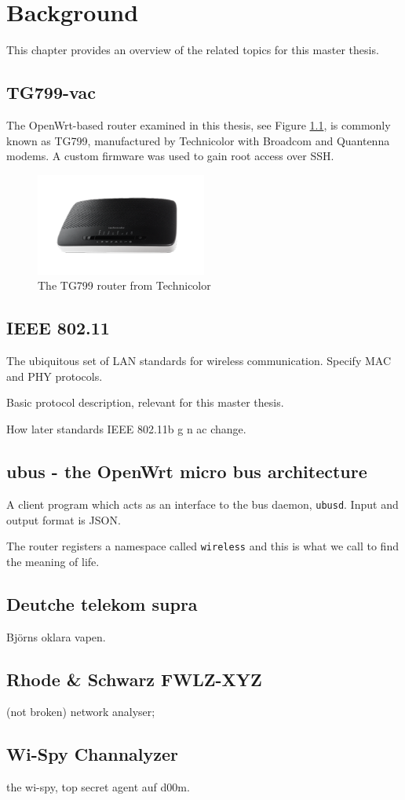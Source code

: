\chapter{Background}

This chapter provides an overview of the related topics for this master thesis.

\section{TG799-vac}

The OpenWrt-based router examined in this thesis, see Figure \ref{fig:tg799}, is commonly known as TG799, manufactured by Technicolor with Broadcom and Quantenna modems. A custom firmware was used to gain root access over SSH.

\begin{figure}
\center
\includegraphics[width=0.5\textwidth]{images/tg799.png}
\caption{The TG799 router from Technicolor}
\label{fig:tg799}
\end{figure}

\section{IEEE 802.11}

The ubiquitous set of LAN standards for wireless communication. Specify MAC and PHY protocols.

Basic protocol description, relevant for this master thesis.

How later standards IEEE 802.11b g n ac change.

\section{ubus - the OpenWrt micro bus architecture}

A client program which acts as an interface to the bus daemon, \texttt{ubusd}. Input and output format is JSON.

The router registers a namespace called \texttt{wireless} and this is what we call to find the meaning of life.

\section{Deutche telekom supra}

Björns oklara vapen.

\section{Rhode \& Schwarz FWLZ-XYZ}

(not broken) network analyser;

\section{Wi-Spy Channalyzer}

the wi-spy, top secret agent auf d00m.
